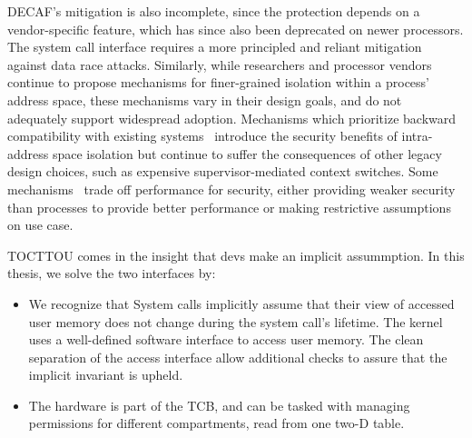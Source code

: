 DECAF's mitigation is also incomplete, since the protection depends on
a vendor-specific feature, which has since also been deprecated on newer
processors.
The system call interface requires a more principled and reliant
mitigation against data race attacks.
Similarly, while researchers and processor vendors continue to propose 
mechanisms for finer-grained isolation within a process' address space, 
these mechanisms vary in their design goals, and do not adequately
support widespread adoption.
Mechanisms which prioritize backward compatibility with existing 
systems~\cite{LittonVE0BD16, HsuHEP16, HedayatiGJCSSM19Hodor, LeeSK18, DuHXZC19XPC}
introduce the security benefits of intra-address space isolation
but continue to suffer the consequences of other legacy design choices, 
such as expensive supervisor-mediated context switches.
Some mechanisms~\cite{ParkLXMK19, HedayatiGJCSSM19Hodor} trade off 
performance for security, either providing weaker security than processes
to provide better performance or making restrictive assumptions on
use case.


TOCTTOU comes in the insight that devs make an implicit assummption.
In this thesis, we solve the two interfaces by:
\begin{itemize}
  \item We recognize that
        System calls implicitly assume that their view of accessed user memory does not change
        during the system call's lifetime. 
        The kernel uses a well-defined software interface to access user memory. 
        The clean separation of the access interface allow additional checks to assure that 
        the implicit invariant is upheld.
  \item The hardware is part of the TCB, and can be tasked with managing permissions for different
        compartments, read from one two-D table.
\end{itemize}

